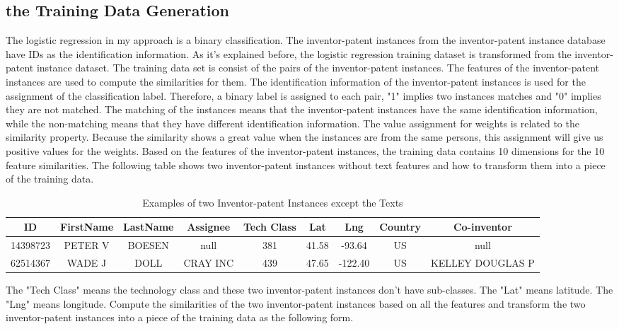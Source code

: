 \subsection{the Training Data Generation}
The logistic regression in my approach is a binary classification. The inventor-patent instances from the inventor-patent instance database have IDs as the identification information. As it's explained before, the logistic regression training dataset is transformed from the inventor-patent instance dataset. The training data set is consist of the pairs of the inventor-patent instances. The features of the inventor-patent instances are used to compute the similarities for them. The identification information of the inventor-patent instances is used for the assignment of the classification label. Therefore, a binary label is assigned to each pair, "1" implies two instances matches and "0" implies they are not matched. The matching of the instances means that the inventor-patent instances have the same identification information, while the non-matching means that they have different identification information. The value assignment for weights is related to the similarity property. Because the similarity shows a great value when the instances are from the same persons, this assignment will give us positive values for the weights. Based on the features of the inventor-patent instances, the training data contains 10 dimensions for the 10 feature similarities. The following table shows two inventor-patent instances without text features and how to transform them into a piece of the training data.

\begin{table}[htb]
\scriptsize
\begin{center}
\begin{tabular}{ | c | c | c | c | c | c | c | c | c |}
\hline
ID & FirstName & LastName & Assignee & Tech Class & Lat & Lng & Country & Co-inventor \\ \hline
14398723 &PETER V & BOESEN & null &  381 & 41.58 & -93.64 & US & null \\ \hline
62514367 &WADE J& DOLL& CRAY INC & 439 &  47.65 & -122.40 & US & KELLEY DOUGLAS P \\
\hline
\end{tabular}
\end{center}
\caption{Examples of two Inventor-patent Instances except the Texts}
\end{table}
The "Tech Class" means the technology class and these two inventor-patent instances don't have sub-classes. The "Lat" means latitude. The "Lng" means longitude. Compute the similarities of the two inventor-patent instances based on all the features and transform the two inventor-patent instances into a piece of the training data as the following form. 

